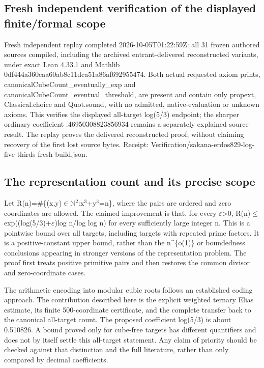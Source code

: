 \documentclass[11pt,a4paper]{article}
\begin{document}
\subsection{Fresh independent verification of the displayed finite/formal scope}
Fresh independent replay completed 2026-10-05T01:22:59Z: all 31 frozen authored sources compiled, including the archived entrant-delivered reconstructed variants, under exact Lean 4.33.1 and Mathlib 0df444a360eaa60ab8c11dca51a86af692955474. Both actual requested axiom prints, canonicalCubeCount\_eventually\_exp and canonicalCubeCount\_eventual\_threshold, are present and contain only propext, Classical.choice and Quot.sound, with no admitted, native-evaluation or unknown axioms. This verifies the displayed all-target log(5/3) endpoint; the sharper ordinary coefficient .46950308823856934 remains a separately explained source result. The replay proves the delivered reconstructed proof, without claiming recovery of the first lost source bytes. Receipt: Verification/sakana-erdos829-log-five-thirds-fresh-build.json.

\subsection{The representation count and its precise scope}
Let R(n)=\#\{(x,y)\ensuremath{\in}\ensuremath{\mathbb{N}}\ensuremath{^2}:x\ensuremath{^3}+y\ensuremath{^3}=n\}, where the pairs are ordered and zero coordinates are allowed. The claimed improvement is that, for every \ensuremath{\varepsilon}>0, R(n)\ensuremath{\leq}exp((log(5/3)+\ensuremath{\varepsilon})log n/log log n) for every sufficiently large integer n. This is a pointwise bound over all targets, including targets with repeated prime factors. It is a positive-constant upper bound, rather than the n\textasciicircum{}\{o(1)\} or boundedness conclusions appearing in stronger versions of the representation problem. The proof first treats positive primitive pairs and then restores the common divisor and zero-coordinate cases.

The arithmetic encoding into modular cubic roots follows an established coding approach. The contribution described here is the explicit weighted ternary Elias estimate, its finite 500-coordinate certificate, and the complete transfer back to the canonical all-target count. The proposed coefficient log(5/3) is about 0.510826. A bound proved only for cube-free targets has different quantifiers and does not by itself settle this all-target statement. Any claim of priority should be checked against that distinction and the full literature, rather than only compared by decimal coefficients.
\end{document}

